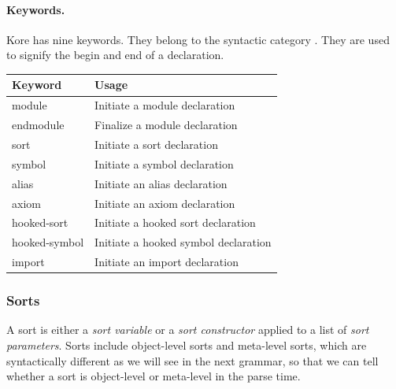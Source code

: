 \documentclass[UTF8,11pt]{article}
\theoremstyle{plain}
\theoremstyle{definition}
\theoremstyle{remark}
\newcommand{\syntacc}[1]{\text{$\langle$\textit{#1}$\rangle$}}
\begin{document}
\paragraph{Keywords.}
Kore has nine keywords.
They belong to the syntactic category \syntacc{keyword}.
They are used to signify the begin and end of a declaration.
\begin{center}
 {\ttfamily
  \begin{tabular}{l|l}
   \textrm{Keyword} & \textrm{Usage}
   \\\hline
   module & \textrm{Initiate a module declaration}
   \\
   endmodule & \textrm{Finalize a module declaration}
   \\
   sort & \textrm{Initiate a sort declaration}
   \\
   symbol & \textrm{Initiate a symbol declaration}
   \\
   alias & \textrm{Initiate an alias declaration}
   \\
   axiom & \textrm{Initiate an axiom declaration}
   \\
   hooked-sort & \textrm{Initiate a hooked sort declaration}
   \\
   hooked-symbol & \textrm{Initiate a hooked symbol declaration}
   \\
   import & \textrm{Initiate an import declaration}
 \end{tabular}}
\end{center}


\subsubsection{Sorts}
\label{sec:kore-syntax-sorts}
A sort is either a \emph{sort variable} or a \emph{sort constructor} applied to
a list of \emph{sort parameters}.
Sorts include object-level sorts and meta-level sorts, which are syntactically
different as we will see in the next grammar, so that we can tell whether a
sort is object-level or meta-level in the parse time.
\end{document}
